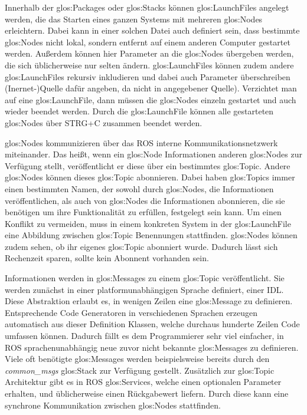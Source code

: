 Innerhalb der \glspl{glos:Package} oder \glspl{glos:Stack} können \glspl{glos:LaunchFile} angelegt werden, die das Starten eines ganzen Systems mit mehreren \glspl{glos:Node} erleichtern. Dabei kann in einer solchen Datei auch definiert sein, dass bestimmte \glspl{glos:Node} nicht lokal, sondern entfernt auf einem anderen Computer gestartet werden. Außerdem können hier Parameter an die \glspl{glos:Node} übergeben werden, die sich üblicherweise nur selten ändern. \glspl{glos:LaunchFile} können zudem andere \glspl{glos:LaunchFile} rekursiv inkludieren und dabei auch Parameter überschreiben{\color{red} (Inernet-)Quelle dafür angeben, da nicht in angegebener Quelle)}. Verzichtet man auf eine \gls{glos:LaunchFile}, dann müssen die \glspl{glos:Node} einzeln gestartet und auch wieder beendet werden. Durch die \gls{glos:LaunchFile} können alle gestarteten \glspl{glos:Node} über STRG+C zusammen beendet werden.

\glspl{glos:Node} kommunizieren über das \gls{ROS} interne Kommunikationsnetzwerk miteinander. Das heißt, wenn ein \gls{glos:Node} Informationen anderen \glspl{glos:Node} zur Verfügung stellt, veröffentlicht er diese über ein bestimmtes \gls{glos:Topic}. Andere \glspl{glos:Node} können dieses \gls{glos:Topic} abonnieren. Dabei haben \glspl{glos:Topic} immer einen bestimmten Namen, der sowohl durch \glspl{glos:Node}, die Informationen veröffentlichen, als auch von \glspl{glos:Node} die Informationen abonnieren, die sie benötigen um ihre Funktionalität zu erfüllen, festgelegt sein kann. Um einen Konflikt zu vermeiden, muss in einem konkreten System in der \gls{glos:LaunchFile} eine Abbildung zwischen \gls{glos:Topic} Benennungen stattfinden. \glspl{glos:Node} können zudem sehen, ob ihr eigenes \gls{glos:Topic} abonniert wurde. Dadurch lässt sich Rechenzeit sparen, sollte kein Abonnent vorhanden sein.

Informationen werden in \glspl{glos:Message} zu einem \gls{glos:Topic} veröffentlicht. Sie werden zunächst in einer platformunabhängigen Sprache definiert, einer \gls{IDL}. Diese Abstraktion erlaubt es, in wenigen Zeilen eine \gls{glos:Message} zu definieren. Entsprechende Code Generatoren in verschiedenen Sprachen erzeugen automatisch aus dieser Definition Klassen, welche durchaus hunderte Zeilen Code umfassen können. Dadurch fällt es dem Programmierer sehr viel einfacher, in \gls{ROS} sprachenunabhängig neue zuvor nicht bekannte \glspl{glos:Message} zu definieren. Viele oft benötigte \glspl{glos:Message} werden beispielsweise bereits durch den \emph{common\_msgs} \gls{glos:Stack} zur Verfügung gestellt. Zusätzlich zur \gls{glos:Topic} Architektur gibt es in \gls{ROS} \glspl{glos:Service}, welche einen optionalen Parameter erhalten, und üblicherweise einen Rückgabewert liefern. Durch diese kann eine synchrone Kommunikation zwischen \glspl{glos:Node} stattfinden. 

